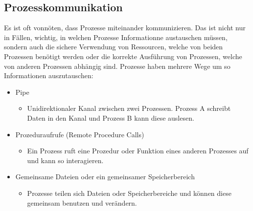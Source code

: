 \documentclass{article}
\begin{document}
	 \subsection{Prozesskommunikation}
	 Es ist oft vonnöten, dass Prozesse miteinander kommunizieren. Das ist nicht nur in Fällen, wichtig, in welchen Prozesse Informationne austauschen müssen, sondern auch die sichere Verwendung von Ressourcen, welche von beiden Prozessen benötigt werden oder die korrekte Ausführung von Prozessen, welche von anderen Prozessen abhängig sind. Prozesse haben mehrere Wege um so Informationen auszutauschen:
	 \begin{itemize}
	 	\item{Pipe}
	 	\begin{itemize}
	 		\item{Unidirektionaler Kanal zwischen zwei Prozessen. Prozess A schreibt Daten in den Kanal und Prozess B kann diese auslesen.}
	 	\end{itemize}
	 	\item{Prozeduraufrufe (Remote Procedure Calls)}
	 	\begin{itemize}
	 		\item{Ein Prozess ruft eine Prozedur oder Funktion eines anderen Prozesses auf und kann so interagieren.}
	 	\end{itemize}
	 	\item{Gemeinsame Dateien oder ein gemeinsamer Speicherbereich}
	 	\begin{itemize}
	 		\item{Prozesse teilen sich Dateien oder Speicherbereiche und können diese gemeinsam benutzen und verändern.}
	 	\end{itemize}
	 \end{itemize}     
\end{document}
